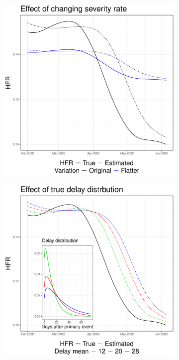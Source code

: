 \documentclass{article}
\begin{document}
\begin{figure}[htb]
\centering
\begin{subfigure}[b]{0.325\linewidth}
  \centering
  \includegraphics[width=\linewidth]{Figures/Simulated/toy_chging_hfr.pdf} 
  \caption{}
  \label{fig:toy_hfr}
\end{subfigure}
\begin{subfigure}[b]{0.325\linewidth}
  \centering
  \includegraphics[width=\linewidth]{Figures/Simulated/toy_delay_distr.pdf}

\end{subfigure}
\end{figure}
\end{document}
